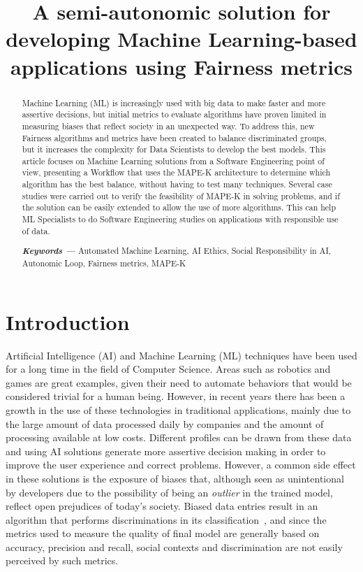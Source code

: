 \documentclass[10pt,conference]{IEEEtran}
\title{A semi-autonomic solution for developing Machine Learning-based applications using Fairness metrics}
\providecommand{\keywords}[1]
{
  \small	
  \textbf{\textit{Keywords ---}} #1
}
\begin{document}
\maketitle

\begin{abstract}
Machine Learning (ML) is increasingly used with big data to make faster and more assertive decisions, but initial metrics to evaluate algorithms have proven limited in measuring biases that reflect society in an unexpected way. To address this, new Fairness algorithms and metrics have been created to balance discriminated groups, but it increases the complexity for Data Scientists to develop the best models. This article focuses on Machine Learning solutions from a Software Engineering point of view, presenting a Workflow that uses the MAPE-K architecture to determine which algorithm has the best balance, without having to test many techniques. Several case studies were carried out to verify the feasibility of MAPE-K in solving problems, and if the solution can be easily extended to allow the use of more algorithms. This can help ML Specialists to do Software Engineering studies on applications with responsible use of data.

\keywords{Automated Machine Learning, AI Ethics, Social Responsibility in AI, Autonomic Loop, Fairness metrics, MAPE-K}
\end{abstract}

\section{Introduction}

Artificial Intelligence (AI) and Machine Learning (ML) techniques have been used for a long time in the field of Computer Science. Areas such as robotics and games are great examples, given their need to automate behaviors that would be considered trivial for a human being. However, in recent years there has been a growth in the use of these technologies in traditional applications, mainly due to the large amount of data processed daily by companies and the amount of processing available at low costs. Different profiles can be drawn from these data and using AI solutions generate more assertive decision making in order to improve the user experience and correct problems. However, a common side effect in these solutions is the exposure of biases that, although seen as unintentional by developers due to the possibility of being an \textit{outlier} in the trained model, reflect open prejudices of today's society. Biased data entries result in an algorithm that performs discriminations in its classification~\citep{Buolamwini_2018}, and since the metrics used to measure the quality of final model are generally based on accuracy, precision and recall, social contexts and discrimination are not easily perceived by such metrics.
\end{document}
